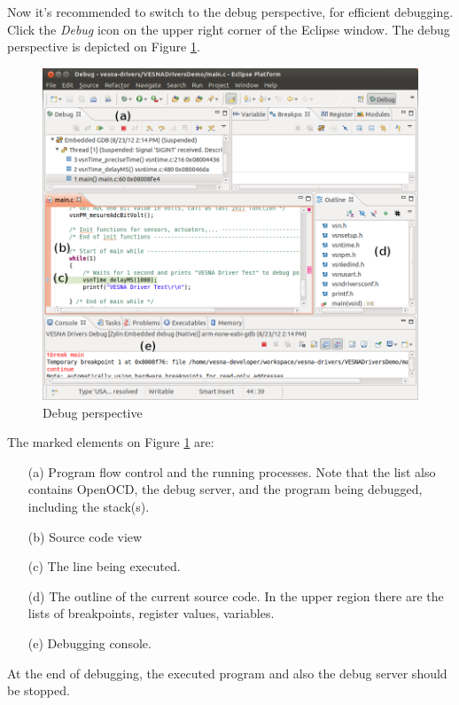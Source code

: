 \documentclass[a4paper, 10pt]{article}
\begin{document}
Now it's recommended to switch to the debug perspective,
for efficient debugging.
Click the \emph{Debug} icon on the upper right corner of the Eclipse window.
The debug perspective is depicted on Figure \ref{fig:debug-window}.


    \begin{figure}[H]
    \centering
        \includegraphics[width=\textwidth]{./install-guide-linux-images/debug-window.png}
        \caption{Debug perspective}
        \label{fig:debug-window}
    \end{figure}

The marked elements on Figure \ref{fig:debug-window} are:
    \begin{itemize}
    \item[(a)] Program flow control and the running processes.
        Note that the list also contains OpenOCD, the debug server,
        and the program being debugged, including the stack(s).
    \item[(b)] Source code view
    \item[(c)] The line being executed.
    \item[(d)] The outline of the current source code.
        In the upper region there are the lists of breakpoints, register values,
        variables.
    \item[(e)] Debugging console.
    \end{itemize}

At the end of debugging, the executed program and also the
debug server should be stopped.
\end{document}
